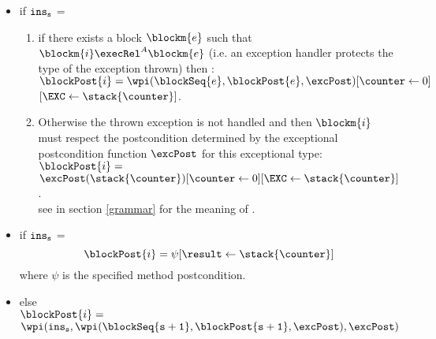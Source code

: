 \begin{defn}
\begin{itemize}
\item  if  $\tt{ins}_s$ =   \\ 
	\begin{enumerate}
\item if there exists a block $\blockm{e}$ such that 
$\blockm{i} \execRel^A \blockm{e}$ (i.e. an exception handler protects the type of the exception thrown)
then :\\
$\blockPost{i }= \\ \wpi(\blockSeq{e}, \blockPost{e} ,\excPost)[\counter \leftarrow 0]$\\
\Myspace \Myspace \Myspace  \Myspace  \Myspace  \Myspace  \Myspace  $[\EXC \leftarrow \stack{\counter}] $. \\
\item Otherwise the thrown exception is not handled and then $\blockm{i}$ must respect the postcondition determined by
the exceptional postcondition function $\excPost$ for this exceptional type:\\ %
 $\blockPost{i }=$\\ $\excPost(\stack{\counter}) [\counter \leftarrow 0][\EXC \leftarrow \stack{\counter}] $. \\
see in section \ref{grammar} for the meaning of \EXC.
    \end{enumerate}
\item  if  $\tt{ins}_s$ =  \\
$$
   \blockPost{i } = \psi[\result \leftarrow \stack{\counter} ]    
$$
where $\psi $ is the specified method postcondition.
\item  else  \\[3 mm]
 $ \blockPost{i} =$  \\ $\wpi(  \tt{ins}_s , \wpi( \blockSeq{s+1} ,  \blockPost{ s  +1}, \excPost) , \excPost)  $
 \end{itemize}

\end{defn}

